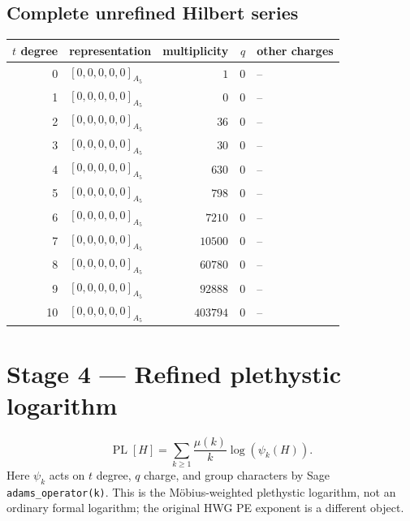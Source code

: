 \documentclass[11pt]{article}
\newcommand{\Dynkin}[1]{#1}
\begin{document}
\subsection{Complete unrefined Hilbert series}
\begin{longtable}{r l r r l}
\toprule $t$ degree & representation & multiplicity & $q$ & other charges\\\midrule\endhead
0 & $\Dynkin{[0,0,0,0,0]_{A_5}}$ & $1$ & $0$ & --\\
1 & $\Dynkin{[0,0,0,0,0]_{A_5}}$ & $0$ & $0$ & --\\
2 & $\Dynkin{[0,0,0,0,0]_{A_5}}$ & $36$ & $0$ & --\\
3 & $\Dynkin{[0,0,0,0,0]_{A_5}}$ & $30$ & $0$ & --\\
4 & $\Dynkin{[0,0,0,0,0]_{A_5}}$ & $630$ & $0$ & --\\
5 & $\Dynkin{[0,0,0,0,0]_{A_5}}$ & $798$ & $0$ & --\\
6 & $\Dynkin{[0,0,0,0,0]_{A_5}}$ & $7210$ & $0$ & --\\
7 & $\Dynkin{[0,0,0,0,0]_{A_5}}$ & $10500$ & $0$ & --\\
8 & $\Dynkin{[0,0,0,0,0]_{A_5}}$ & $60780$ & $0$ & --\\
9 & $\Dynkin{[0,0,0,0,0]_{A_5}}$ & $92888$ & $0$ & --\\
10 & $\Dynkin{[0,0,0,0,0]_{A_5}}$ & $403794$ & $0$ & --\\
\bottomrule\end{longtable}
\section{Stage 4 --- Refined plethystic logarithm}
\[\operatorname{PL}[H]=\sum_{k\geq1}\frac{\mu(k)}{k}\log(\psi_k(H)).\] Here $\psi_k$ acts on $t$ degree, $q$ charge, and group characters by Sage \texttt{adams\_operator(k)}. This is the M\"obius-weighted plethystic logarithm, not an ordinary formal logarithm; the original HWG PE exponent is a different object.
\end{document}

